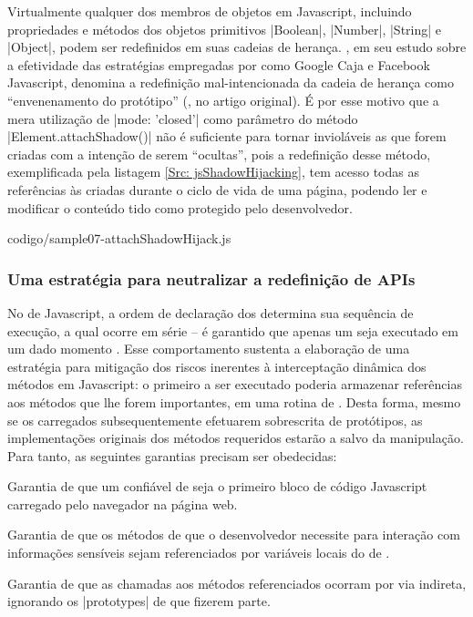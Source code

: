 Virtualmente qualquer dos membros de objetos em Javascript, incluindo propriedades e métodos dos objetos primitivos |Boolean|, |Number|, |String| e |Object|, podem ser redefinidos em suas cadeias de herança. , em seu estudo sobre a efetividade das estratégias empregadas por  como Google Caja e Facebook Javascript, denomina a redefinição mal-intencionada da cadeia de herança como ``envenenamento do protótipo'' (, no artigo original). É por esse motivo que a mera utilização de |{mode: 'closed'}| como parâmetro do método |Element.attachShadow()| não é suficiente para tornar invioláveis as  que forem criadas com a intenção de serem ``ocultas'', pois a redefinição desse método, exemplificada pela listagem \ref{Src: jsShadowHijacking}, tem acesso todas as referências às  criadas durante o ciclo de vida de uma página, podendo ler e modificar o conteúdo tido como protegido pelo desenvolvedor.


	{codigo/sample07-attachShadowHijack.js}

\subsubsection{Uma estratégia para neutralizar a redefinição de APIs}

No  de Javascript, a ordem de declaração dos {\scripts} determina sua sequência de execução, a qual ocorre em série -- é garantido que apenas um {\script} seja executado em um dado momento \cite[seção 8.3]{ECMA2017}. Esse comportamento sustenta a elaboração de uma estratégia para mitigação dos riscos inerentes à interceptação dinâmica dos métodos em Javascript: o primeiro {\script} a ser executado poderia armazenar referências aos métodos que lhe forem importantes, em uma rotina de . Desta forma, mesmo se os {\scripts} carregados subsequentemente efetuarem sobrescrita de protótipos, as implementações originais dos métodos requeridos estarão a salvo da manipulação. Para tanto, as seguintes garantias precisam ser obedecidas:

\begin{alineas}
	\item Garantia de que um {\script} confiável de  seja o primeiro bloco de código Javascript carregado pelo navegador na página web.
	\item Garantia de que os métodos de que o desenvolvedor necessite para interação com informações sensíveis sejam referenciados por variáveis locais do {\script} de .
	\item Garantia de que as chamadas aos métodos referenciados ocorram por via indireta, ignorando os |prototypes| de que fizerem parte.
\end{alineas}

